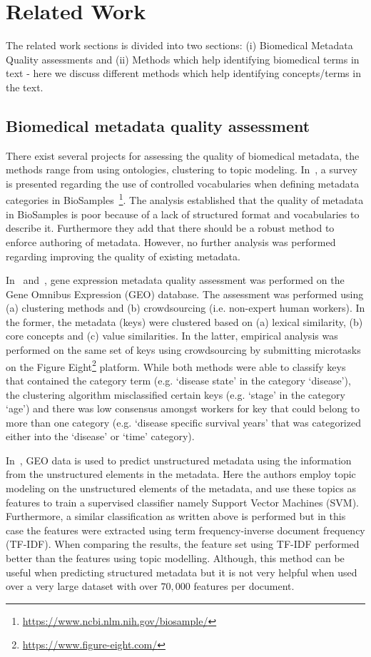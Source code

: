 \chapter{Related Work}\label{chap2}
The related work sections is divided into two sections: (i) Biomedical Metadata Quality assessments and (ii) Methods which help identifying biomedical terms in text - here we discuss different methods which help identifying concepts/terms in the text. 

\section{Biomedical metadata quality assessment}
There exist several projects for assessing the quality of biomedical metadata, the methods range from using ontologies, clustering to topic modeling. 
In~\cite{gonccalves2017metadata}, a survey is presented regarding the use of controlled vocabularies when defining metadata categories in BioSamples~\footnote{\url{https://www.ncbi.nlm.nih.gov/biosample/}}. The analysis established that the quality of metadata in BioSamples is poor because of a lack of structured format and vocabularies to describe it. Furthermore they add that there should be a robust method to enforce authoring of metadata. However, no further analysis was performed regarding improving the quality of existing metadata. 

In~\cite{Hu2017} and~\cite{zaveri2017metacrowd}, gene expression metadata quality assessment was performed on the Gene Omnibus Expression (GEO) database. The assessment was performed using (a) clustering methods and (b) crowdsourcing (i.e. non-expert human workers). In the former, the metadata (keys) were clustered based on (a) lexical similarity, (b) core concepts and (c) value similarities. In the latter, empirical analysis was performed on the same set of keys using crowdsourcing by submitting microtasks on the Figure Eight\footnote{\url{https://www.figure-eight.com/}} platform. While both methods were able to classify keys that contained the category term (e.g. `disease state' in the category `disease'), the clustering algorithm misclassified certain keys (e.g. `stage' in the category `age') and there was low consensus amongst workers for key that could belong to more than one category (e.g. `disease specific survival years' that was categorized either into the `disease' or `time' category).

In~\cite{posch2016predicting}, GEO data is used to predict unstructured metadata using the information from the unstructured elements in the metadata. Here the authors employ topic modeling on the unstructured elements of the metadata, and use these topics as features to train a supervised classifier namely Support Vector Machines (SVM). Furthermore, a similar classification as written above is performed but in this case the features were extracted using term frequency-inverse document frequency (TF-IDF). When comparing the results, the feature set using TF-IDF performed better than the features using topic modelling. Although, this method can be useful when predicting structured metadata but it is not very helpful when used over a very large dataset with over $70,000$ features per document.

